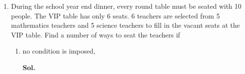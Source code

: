 \documentclass{report}
\newcommand\comb[2][^n]{{}_{#1}C_{#2}}
\newcommand{\sol}[1]{

      \noindent \textbf{Sol.}
}
\def\eos{\quad\hbox{\rlap{\hbox{\vrule depth 1.5pt height 2.6mm width 0.2mm \hskip 1mm \vrule height 2.6mm width 0.2mm}}{\vbox{\hrule height 0.2mm width 1.4mm \vskip 2.8mm \hrule depth 1.5pt height -0.35mm width 1.2mm}}}}
\begin{document}
\begin{multicols*}{2}
\begin{enumerate}
\begin{enumerate}
                              Choose 7 students from 17 students. There are $\comb[17]{7} = 19\,448$ ways to
                              do so. $\eos$

                        \item there are 3 male students and 4 female students. \sol{}

                              Choose 3 male students from 7 male students, there are $\comb[7]{3} = 35$ ways
                              to do so.

                              Choose 4 female students from 10 female students, there are $\comb[10]{4} =
                                    210$ ways to do so.

                              Hence, there are $35 \times 210 = 7\,350$ ways to form the committee. $\eos$

                        \item  The number of female students must be more than the number of male students.
                              \sol{}

                              Choose 1 male student and 9 female students, there are $\comb[7]{1} \times
                                    \comb[10]{6} = 1\,470$ ways to do so.

                              Choose 2 male student and 8 female students, there are $\comb[7]{2} \times
                                    \comb[10]{5} = 5\,292$ ways to do so.

                              Choose 3 male student and 7 female students, there are $\comb[7]{3} \times
                                    \comb[10]{4} = 7\,350$ ways to do so.

                              Hence, there are $1\,470 + 5\,292 + 7\,350 = 14\,112$ ways to form the
                              committee. $\eos$

                  \end{enumerate}
            \item During the school year end dinner, every round table must be seated with 10
                  people. The VIP table has only 6 seats. 6 teachers are selected from 5
                  mathematics teachers and 5 science teachers to fill in the vacant seats at the
                  VIP table. Find a number of ways to seat the teachers if
                  \begin{enumerate}
                        \item no condition is imposed, \sol{}


\end{enumerate}
\end{enumerate}
\end{multicols*}
\end{document}
